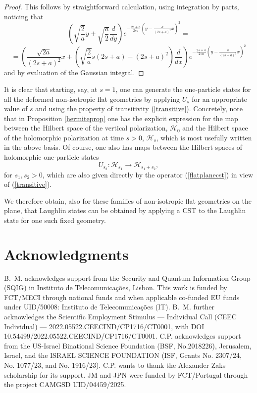 \documentclass[a4paper,11pt]{article}
\begin{document}
\begin{appendices}
\begin{proof}
This follows by straightforward calculation, using integration by parts, noticing that
$$
\left(\sqrt{\frac{2}{a}}y + \sqrt{\frac{a}{2}} \frac{d}{dy}  \right) 
e^{-\frac{2s+a}{2sa}\left(y-\frac{a}{(2s+a)^2}x\right)^2} = 
$$
$$
=
\left(\frac{\sqrt{2a}}{(2s+a)^2} x + \left(\sqrt{\frac{2}{a}}s(2s+a) - (2s+a)^2\right) \frac{d}{dx}   \right) e^{-\frac{2s+a}{2sa}\left(y-\frac{a}{(2s+a)^2}x\right)^2}
 $$
 and by evaluation of the Gaussian integral.
\end{proof}

It is clear that starting, say, at $s=1$, one can generate  the one-particle states for all the deformed non-isotropic flat geometries by applying $U_s$ for an appropriate value of $s$ and using the property of transitivity (\ref{transitive}). Concretely, note that in Proposition \ref{hermiteprop} one has the explicit expression for the map between the Hilbert space of the vertical polarization, $\mathcal{H}_0$ and the Hilbert space of the holomorphic polarization at time $s>0$, $\mathcal{H}_s$, which is most usefully written in the above basis. Of course, one also has maps between the Hilbert spaces of holomorphic one-particle states
$$
U_{s_2}: \mathcal{H}_{s_1}\to \mathcal{H}_{s_1+s_2},
$$
for $s_1, s_2>0$, which are also given directly by the operator (\ref{flatplanecst}) in view of (\ref{transitive}).

We therefore obtain, also for these families of non-isotropic flat geometries on the plane, that Laughlin states can be obtained by applying a CST to the Laughlin state for one such fixed geometry. 
{}


\end{appendices}






%
\section*{Acknowledgments}
%
B.~M. acknowledges support from the Security and Quantum Information Group (SQIG) in Instituto de Telecomunica\c{c}\~{o}es, Lisbon. This work is funded by FCT/MECI through national funds and when applicable co-funded EU funds under UID/50008: Instituto de Telecomunicações (IT). B.~M. further acknowledges the Scientific Employment Stimulus --- Individual Call (CEEC Individual) --- 2022.05522.CEECIND/CP1716/CT0001, with DOI 10.54499/2022.05522.CEECIND/CP1716/CT0001.  C.P. acknowledges support from the US-Israel Binational Science Foundation (BSF,
No.2018226), Jerusalem, Israel, and the ISRAEL SCIENCE
FOUNDATION (ISF, Grants No. 2307/24, No. 1077/23, and
No. 1916/23). C.P. wants to thank the Alexander Zaks scholarship for its support.
JM and JPN were funded by  FCT/Portugal through the project CAMGSD UID/04459/2025.






\end{document}
